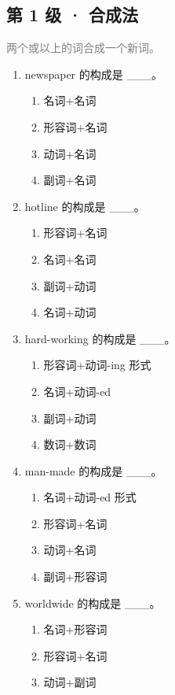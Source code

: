 \documentclass[11pt,a4paper]{ctexart}
\begin{document}
\subsection*{第 1 级 · 合成法}
\noindent\textcolor{gray}{两个或以上的词合成一个新词。}\par\smallskip
\begin{enumerate}[leftmargin=*,itemsep=4pt]
\item newspaper 的构成是 \_\_\_。
\begin{enumerate}[label=\Alph*.,leftmargin=2em,itemsep=1pt,topsep=2pt]
\item 名词+名词
\item 形容词+名词
\item 动词+名词
\item 副词+名词
\end{enumerate}
\item hotline 的构成是 \_\_\_。
\begin{enumerate}[label=\Alph*.,leftmargin=2em,itemsep=1pt,topsep=2pt]
\item 形容词+名词
\item 名词+名词
\item 副词+动词
\item 名词+动词
\end{enumerate}
\item hard-working 的构成是 \_\_\_。
\begin{enumerate}[label=\Alph*.,leftmargin=2em,itemsep=1pt,topsep=2pt]
\item 形容词+动词-ing 形式
\item 名词+动词-ed
\item 副词+动词
\item 数词+数词
\end{enumerate}
\item man-made 的构成是 \_\_\_。
\begin{enumerate}[label=\Alph*.,leftmargin=2em,itemsep=1pt,topsep=2pt]
\item 名词+动词-ed 形式
\item 形容词+名词
\item 动词+名词
\item 副词+形容词
\end{enumerate}
\item worldwide 的构成是 \_\_\_。
\begin{enumerate}[label=\Alph*.,leftmargin=2em,itemsep=1pt,topsep=2pt]
\item 名词+形容词
\item 形容词+名词
\item 动词+副词

\end{enumerate}
\end{enumerate}
\end{document}
